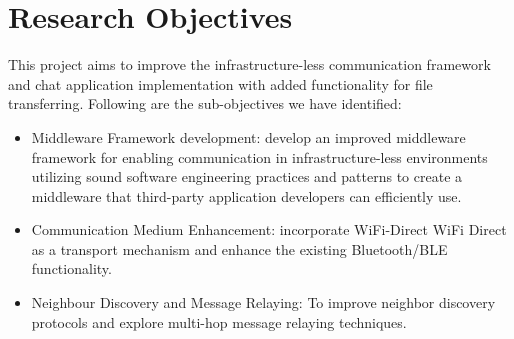 \section{Research Objectives}

This project aims to improve the infrastructure-less communication framework
and chat application implementation with added functionality for file
transferring. Following are the sub-objectives we have identified:
\begin{itemize}
    \item Middleware Framework development: develop an improved middleware
          framework for enabling communication in infrastructure-less
          environments
          utilizing sound software engineering practices and patterns to create
          a
          middleware that third-party application developers can efficiently
          use.
    \item Communication Medium Enhancement: incorporate WiFi-Direct WiFi Direct
          as a transport mechanism and enhance the existing Bluetooth/BLE functionality.
    \item Neighbour Discovery and Message Relaying: To improve neighbor
          discovery protocols and explore multi-hop message relaying techniques.
\end{itemize}

